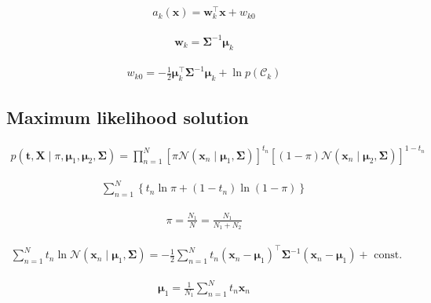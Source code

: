 \documentclass{article}
\begin{document}
\begin{align*}
a_k(\mathbf{x}) = \mathbf{w}_k^{\top} \mathbf{x} + w_{k0}
\tag{5.51}
\end{align*}

\begin{align*}
\mathbf{w}_k = \boldsymbol{\Sigma}^{-1} \boldsymbol{\mu}_k
\tag{5.52}
\end{align*}

\begin{align*}
w_{k0} = -\frac{1}{2} \boldsymbol{\mu}_k^{\top} \boldsymbol{\Sigma}^{-1} \boldsymbol{\mu}_k + \ln p\left(\mathcal{C}_k\right)
\tag{5.53}
\end{align*}

\subsection{Maximum likelihood solution}

\begin{align*}
p\left(\mathbf{t}, \mathbf{X} \mid \pi, \boldsymbol{\mu}_1, \boldsymbol{\mu}_2, \boldsymbol{\Sigma}\right) = \prod_{n=1}^{N} \left[ \pi \mathcal{N}\left( \mathbf{x}_n \mid \boldsymbol{\mu}_1, \boldsymbol{\Sigma} \right) \right]^{t_n} \left[ (1 - \pi) \mathcal{N}\left( \mathbf{x}_n \mid \boldsymbol{\mu}_2, \boldsymbol{\Sigma} \right) \right]^{1 - t_n}
\tag{5.54}
\end{align*}

\begin{align*}
\sum_{n=1}^{N} \left\{ t_n \ln \pi + \left( 1 - t_n \right) \ln (1 - \pi) \right\}
\tag{5.55}
\end{align*}

\begin{align*}
\pi = \frac{N_1}{N} = \frac{N_1}{N_1 + N_2}
\tag{5.56}
\end{align*}

\begin{align*}
\sum_{n=1}^{N} t_{n} \ln \mathcal{N}\left(\mathbf{x}_{n} \mid \boldsymbol{\mu}_{1}, \boldsymbol{\Sigma}\right)=-\frac{1}{2} \sum_{n=1}^{N} t_{n}\left(\mathbf{x}_{n}-\boldsymbol{\mu}_{1}\right)^{\top} \boldsymbol{\Sigma}^{-1}\left(\mathbf{x}_{n}-\boldsymbol{\mu}_{1}\right)+\text{ const. } 
\tag{5.57}
\end{align*}

\begin{align*}
\boldsymbol{\mu}_1 = \frac{1}{N_1} \sum_{n=1}^{N} t_n \mathbf{x}_n
\tag{5.58}
\end{align*}
\end{document}
